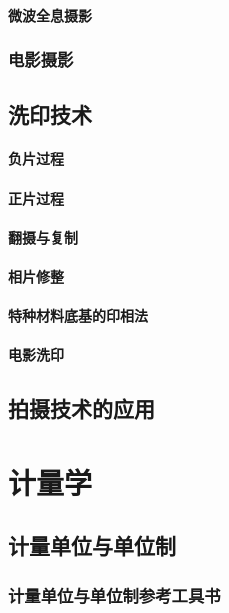 \documentclass[UTF8]{../../ApplicationUniverse}
\begin{document}
        \subsubsection{微波全息摄影}
    \subsection{电影摄影}
\section{洗印技术}
    \subsubsection{负片过程}
    \subsubsection{正片过程}
    \subsubsection{翻摄与复制}
    \subsubsection{相片修整}
    \subsubsection{特种材料底基的印相法}
    \subsubsection{电影洗印}
\section{拍摄技术的应用}









\chapter{计量学}
\section{计量单位与单位制}
    \subsection{计量单位与单位制参考工具书}
\end{document}
